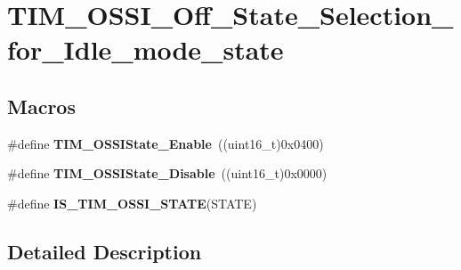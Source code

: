 \hypertarget{group___t_i_m___o_s_s_i___off___state___selection__for___idle__mode__state}{\section{T\-I\-M\-\_\-\-O\-S\-S\-I\-\_\-\-Off\-\_\-\-State\-\_\-\-Selection\-\_\-for\-\_\-\-Idle\-\_\-mode\-\_\-state}
\label{group___t_i_m___o_s_s_i___off___state___selection__for___idle__mode__state}
}
\subsection*{Macros}
\begin{DoxyCompactItemize}
\item 
\hypertarget{group___t_i_m___o_s_s_i___off___state___selection__for___idle__mode__state_gaf643ec0d2edb6c8fb725d00210b3d071}{\#define {\bfseries T\-I\-M\-\_\-\-O\-S\-S\-I\-State\-\_\-\-Enable}~((uint16\-\_\-t)0x0400)}\label{group___t_i_m___o_s_s_i___off___state___selection__for___idle__mode__state_gaf643ec0d2edb6c8fb725d00210b3d071}

\item 
\hypertarget{group___t_i_m___o_s_s_i___off___state___selection__for___idle__mode__state_gae1962736fd5cad82e97a5814ef6758bd}{\#define {\bfseries T\-I\-M\-\_\-\-O\-S\-S\-I\-State\-\_\-\-Disable}~((uint16\-\_\-t)0x0000)}\label{group___t_i_m___o_s_s_i___off___state___selection__for___idle__mode__state_gae1962736fd5cad82e97a5814ef6758bd}

\item 
\#define {\bfseries I\-S\-\_\-\-T\-I\-M\-\_\-\-O\-S\-S\-I\-\_\-\-S\-T\-A\-T\-E}(S\-T\-A\-T\-E)
\end{DoxyCompactItemize}


\subsection{Detailed Description}


